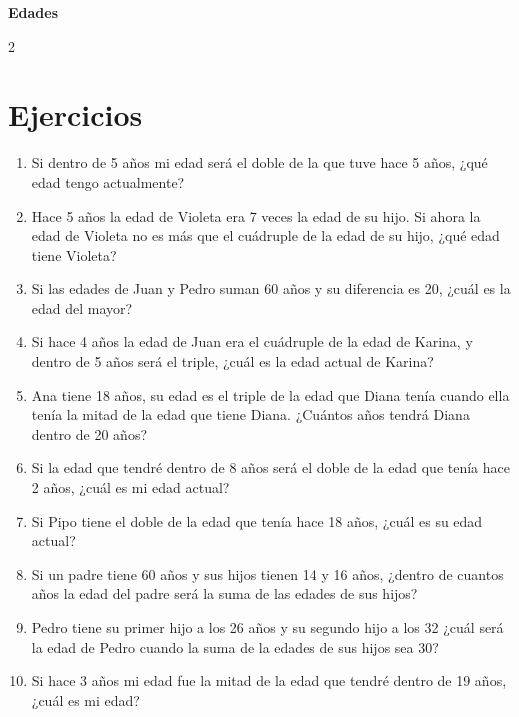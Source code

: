 \documentclass[10pt]{article}
\begin{document}
	\begin{center}
		\Large\bfseries Edades
	\end{center}

\begin{multicols}{2}
	\section*{Ejercicios}
		\begin{enumerate}[label=\textbf{\arabic*.}, itemsep=0.4cm]
			\item Si dentro de 5 años mi edad será el doble de la que tuve hace 5 años, ¿qué edad tengo actualmente?

			\item Hace 5 años la edad de Violeta era 7 veces la edad de su hijo. Si ahora la edad de Violeta no es más que el cuádruple de la edad de su hijo, ¿qué edad tiene Violeta?

			\item Si las edades de Juan y Pedro suman 60 años y su diferencia es 20, ¿cuál es la edad del mayor?

			\item Si hace 4 años la edad de Juan era el cuádruple de la edad de Karina, y dentro de 5 años será el triple, ¿cuál es la edad actual de Karina?

			\item Ana tiene 18 años, su edad es el triple de la edad que Diana tenía cuando ella tenía la mitad de la edad que tiene Diana. ¿Cuántos años tendrá Diana dentro de 20 años?

			\item Si la edad que tendré dentro de 8 años será el doble de la edad que tenía hace 2 años, ¿cuál es mi edad actual?

			\item Si Pipo tiene el doble de la edad que tenía hace 18 años, ¿cuál es su edad actual?

			\item Si un padre tiene 60 años y sus hijos tienen 14 y 16 años, ¿dentro de cuantos años la edad del padre será la suma de las edades de sus hijos?

			\item Pedro tiene su primer hijo a los 26 años y su segundo hijo a los 32 ¿cuál será la edad de Pedro cuando la suma de la edades de sus hijos sea 30?

			\item Si hace 3 años mi edad fue la mitad de la edad que tendré dentro de 19 años, ¿cuál es mi edad?


\end{enumerate}
\end{multicols}
\end{document}

